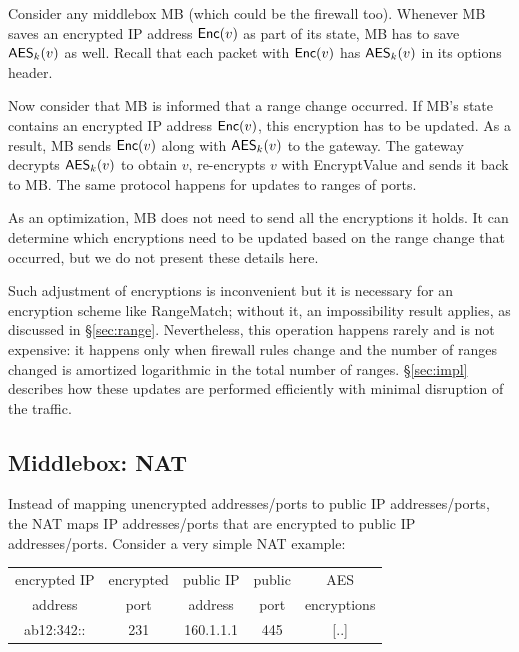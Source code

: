 Consider any middlebox MB (which could be the firewall too). Whenever MB saves an encrypted IP address $\mathsf{Enc}(v)$ as part of its state, MB has to save $\mathsf{AES}_k(v)$ as well.  Recall that each packet with $\mathsf{Enc}(v)$ has $\mathsf{AES}_k(v)$ in its options header.

Now consider that  MB is informed that a range change occurred.  If MB's state  contains an encrypted IP address $\mathsf{Enc}(v)$, this encryption has to be updated.  As a result,  MB sends $\mathsf{Enc}(v)$ along with $\mathsf{AES}_k(v)$ to the gateway. The gateway decrypts $\mathsf{AES}_k(v)$ to obtain $v$, re-encrypts $v$ with EncryptValue and sends it back to MB. 
The same protocol happens for updates to ranges of ports. 


As an optimization, MB does not need to send all the encryptions  it holds. It can determine which encryptions need to be updated based on the range change that occurred, but we do not present these details here. 

Such adjustment of encryptions is inconvenient but it is  necessary for an encryption scheme like RangeMatch; without it, an impossibility result applies, as discussed in \S\ref{sec:range}. Nevertheless, this operation happens rarely and is not expensive: it happens only when firewall rules change and the number of ranges changed is  amortized logarithmic in the total number of ranges. 
 \S\ref{sec:impl} describes how these updates are performed efficiently with minimal disruption of the traffic. 
 



\subsection{Middlebox: NAT}\label{sec:nat}



Instead of mapping unencrypted addresses/ports to public IP addresses/ports, the NAT maps IP addresses/ports that are encrypted to public IP addresses/ports. 
Consider a very simple NAT example:

\smallskip
\begin{tabular}{c|c|c|c|c}
encrypted IP   & encrypted  &  public IP   & public  &  AES   \\
address           & port            &   address   &  port    & encryptions \\
\hline
ab12:342::               & 231                  & 160.1.1.1  &  445 &  [..] \\ 
\end{tabular}
\smallskip

